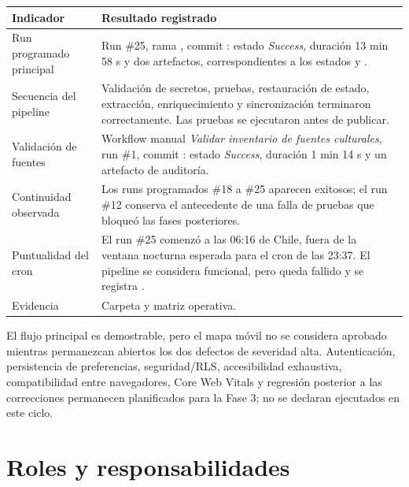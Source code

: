 \documentclass[11pt,a4paper]{article}
\begin{document}
\begin{longtable}{@{}L{5.1cm}L{9.7cm}@{}}
\toprule
\textbf{Indicador} & \textbf{Resultado registrado} \\
\midrule
\endhead
Run programado principal & Run \#25, rama , commit : estado \emph{Success}, duración 13 min 58 s y dos artefactos, correspondientes a los estados  y . \\
Secuencia del pipeline & Validación de secretos, pruebas, restauración de estado, extracción, enriquecimiento y sincronización terminaron correctamente. Las pruebas se ejecutaron antes de publicar. \\
Validación de fuentes & Workflow manual \emph{Validar inventario de fuentes culturales}, run \#1, commit : estado \emph{Success}, duración 1 min 14 s y un artefacto de auditoría. \\
Continuidad observada & Los runs programados \#18 a \#25 aparecen exitosos; el run \#12 conserva el antecedente de una falla de pruebas que bloqueó las fases posteriores. \\
Puntualidad del cron & El run \#25 comenzó a las 06:16 de Chile, fuera de la ventana nocturna esperada para el cron de las 23:37. El pipeline se considera funcional, pero  queda fallido y se registra . \\
Evidencia & Carpeta  y matriz operativa. \\
\bottomrule
\end{longtable}

El flujo principal es demostrable, pero el mapa móvil no se considera aprobado mientras
permanezcan abiertos los dos defectos de severidad alta. Autenticación, persistencia de
preferencias, seguridad/RLS, accesibilidad exhaustiva, compatibilidad entre navegadores,
Core Web Vitals y regresión posterior a las correcciones permanecen planificados para la
Fase 3; no se declaran ejecutados en este ciclo.

\section{Roles y responsabilidades}
\end{document}
